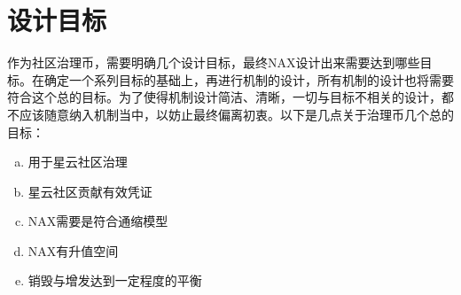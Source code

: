 \section{设计目标}

作为社区治理币，需要明确几个设计目标，最终NAX设计出来需要达到哪些目标。在确定一个系列目标的基础上，再进行机制的设计，所有机制的设计也将需要符合这个总的目标。为了使得机制设计简洁、清晰，一切与目标不相关的设计，都不应该随意纳入机制当中，以妨止最终偏离初衷。以下是几点关于治理币几个总的目标：

\begin{enumerate}[a.]
        \item 用于星云社区治理
        \item 星云社区贡献有效凭证
        \item NAX需要是符合通缩模型
        \item NAX有升值空间
        \item 销毁与增发达到一定程度的平衡
\end{enumerate}

